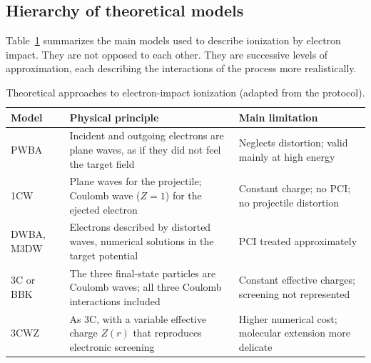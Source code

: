 \documentclass[11pt,a4paper]{article}
\begin{document}
\subsection{Hierarchy of theoretical models}\label{sec:models}
Table~\ref{tab:models} summarizes the main models used to describe ionization by electron impact.
They are not opposed to each other. They are successive levels of approximation, each describing
the interactions of the process more realistically.

\begin{table}[H]\centering\small
\caption{Theoretical approaches to electron-impact ionization (adapted from the protocol).}\label{tab:models}
\begin{tabular}{p{2.8cm}p{6.2cm}p{5.2cm}}\toprule
Model & Physical principle & Main limitation\\\midrule
PWBA~\cite{Bote2008} & Incident and outgoing electrons are plane waves, as if they did not feel the target field & Neglects distortion; valid mainly at high energy\\
1CW~\cite{DalCappello1984,Rezkallah2011} & Plane waves for the projectile; Coulomb wave ($Z=1$) for the ejected electron & Constant charge; no PCI; no projectile distortion\\
DWBA, M3DW~\cite{Gao2005,Madison2010,Xu2012} & Electrons described by distorted waves, numerical solutions in the target potential & PCI treated approximately\\
3C or BBK~\cite{Brauner1989,Garibotti1980} & The three final-state particles are Coulomb waves; all three Coulomb interactions included & Constant effective charges; screening not represented\\
3CWZ~\cite{Bechane2024,Tamin2024,Zaidi2024} & As 3C, with a variable effective charge $Z(r)$ that reproduces electronic screening & Higher numerical cost; molecular extension more delicate\\\bottomrule
\end{tabular}
\end{table}
\end{document}

